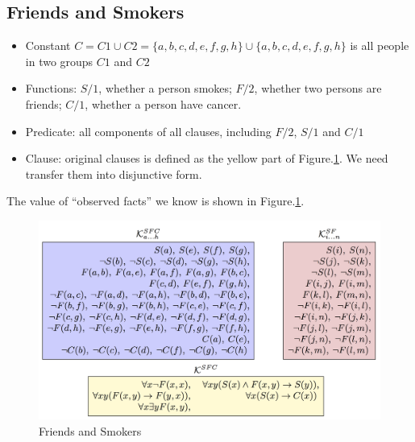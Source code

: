 
\subsection{Friends and Smokers}
\begin{itemize}
    \item Constant $C=C1 \cup C2=\{a,b,c,d,e,f,g,h\}\cup \{a,b,c,d,e,f,g,h\}$ is all people in two groups $C1$ and $C2$
    \item Functions: $S/1$, whether a person smokes; $F/2$, whether two persons are friends; $C/1$, whether a person have cancer.
    \item Predicate: all components of all clauses, including $F/2$, $S/1$ and $C/1$
    \item Clause: original clauses is defined as the yellow part of Figure.\ref{fig:example}. We need transfer them into disjunctive form.
\end{itemize}

The value of ``observed facts'' we know is shown in Figure.\ref{fig:example}.

\begin{figure}
    \centering
    \includegraphics[width=.45\textwidth]{img/example.png}
    \caption{Friends and Smokers}
    \label{fig:example}
\end{figure}
